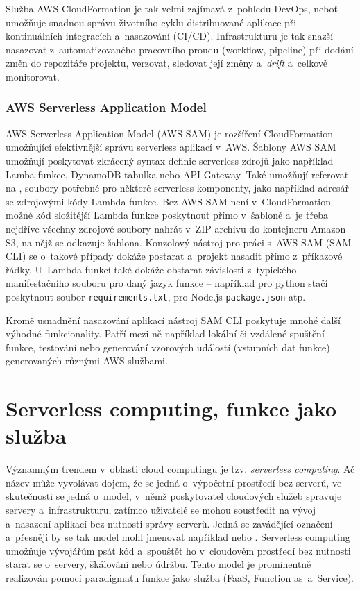 \documentclass[czech, ing, kiv, he, iso690]{fasthesis}
\begin{document}
Služba AWS CloudFormation je tak velmi zajímavá z~pohledu DevOps, neboť umožňuje snadnou správu životního cyklu distribuované aplikace při kontinuálních integracích a~nasazování (CI/CD). Infrastrukturu je tak snazší nasazovat z~automatizovaného pracovního proudu (workflow, pipeline) při dodání změn do repozitáře projektu, verzovat, sledovat její změny a~\emph{drift} a~celkově monitorovat.


\subsubsection{AWS Serverless Application Model}

AWS Serverless Application Model (AWS SAM) je rozšíření CloudFormation umožňující efektivnější správu serverless aplikací v~AWS. Šablony AWS SAM umožňují poskytovat zkrácený syntax definic serverless zdrojů jako například Lamba funkce, DynamoDB tabulka nebo API Gateway. Také umožňují referovat na , soubory potřebné pro některé serverless komponenty, jako například adresář se zdrojovými kódy Lambda funkce. Bez AWS SAM není v~CloudFormation možné kód složitější Lambda funkce poskytnout přímo v~šabloně a~je třeba nejdříve všechny zdrojové soubory nahrát v~ZIP archivu do kontejneru Amazon S3, na nějž se odkazuje šablona. Konzolový nástroj pro práci s~AWS SAM (SAM CLI) se o~takové případy dokáže postarat a~projekt nasadit přímo z~příkazové řádky. U~Lambda funkcí také dokáže obstarat závislosti z~typického manifestačního souboru pro daný jazyk funkce -- například pro python stačí poskytnout soubor \texttt{requirements.txt}, pro Node.js \texttt{package.json} atp.

Kromě usnadnění nasazování aplikací nástroj SAM CLI poskytuje mnohé další výhodné funkcionality. Patří mezi ně například lokální či vzdálené spuštění funkce, testování nebo generování vzorových událostí (vstupních dat funkce) generovaných různými AWS službami.


\section{Serverless computing, funkce jako služba}
\label{sec:serverless_computing}

Významným trendem v~oblasti cloud computingu je tzv. \emph{serverless computing}. Ač název může vyvolávat dojem, že se jedná o~výpočetní prostředí bez serverů, ve skutečnosti se jedná o~model, v~němž poskytovatel cloudových služeb spravuje servery a~infrastrukturu, zatímco uživatelé se mohou soustředit na vývoj a~nasazení aplikací bez nutnosti správy serverů. Jedná se zavádějící označení a~přesněji by se tak model mohl jmenovat například  nebo . Serverless computing umožňuje vývojářům psát kód a~spouštět ho v~cloudovém prostředí bez nutnosti starat se o~servery, škálování nebo údržbu. Tento model je prominentně realizován pomocí paradigmatu funkce jako služba (FaaS, Function as~a~Service). 
\end{document}
